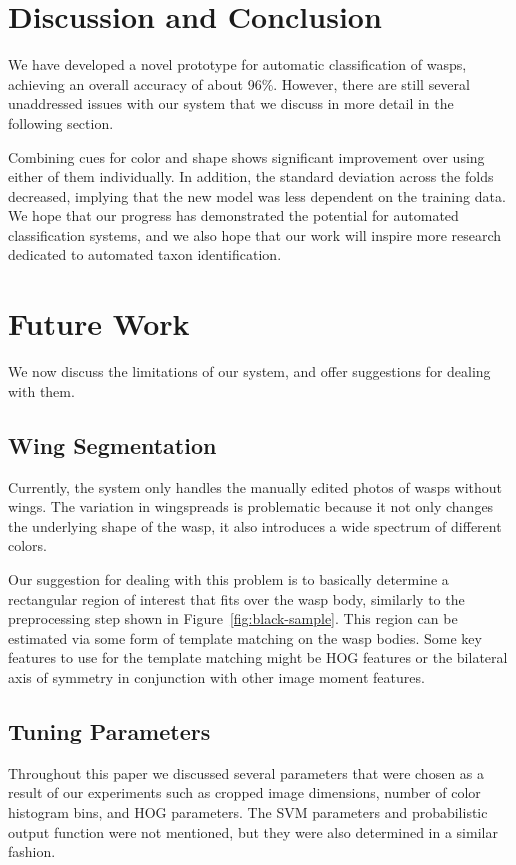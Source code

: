 \documentclass[a4paper,12pt]{article}
\begin{document}
\section{Discussion and Conclusion}
We have developed a novel prototype for automatic classification of wasps, achieving an overall accuracy of about 96\%. However, there are still several unaddressed issues with our system that we discuss in more detail in the following section.

Combining cues for color and shape shows significant improvement over using either of them individually. In addition, the standard deviation across the folds decreased, implying that the new model was less dependent on the training data. We hope that our progress has demonstrated the potential for automated classification systems, and we also hope that our work will inspire more research dedicated to automated taxon identification.

\section{Future Work}
We now discuss the limitations of our system, and offer suggestions for dealing with them.

\subsection{Wing Segmentation}
Currently, the system only handles the manually edited photos of wasps without wings. The variation in wingspreads is problematic because it not only changes the underlying shape of the wasp, it also introduces a wide spectrum of different colors.

Our suggestion for dealing with this problem is to basically determine a rectangular region of interest that fits over the wasp body, similarly to the preprocessing step shown in Figure~\ref{fig:black-sample}. This region can be estimated via some form of template matching on the wasp bodies. Some key features to use for the template matching might be HOG features or the bilateral axis of symmetry in conjunction with other image moment features.

\subsection{Tuning Parameters}
Throughout this paper we discussed several parameters that were chosen as a result of our experiments such as cropped image dimensions, number of color histogram bins, and HOG parameters. The SVM parameters and probabilistic output function were not mentioned, but they were also determined in a similar fashion.
\end{document}
